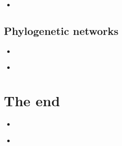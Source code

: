 \documentclass[compress, ucs, xelatex, 11pt, xcolor=x11names, aspectratio=1609,
	hyperref={
		bookmarks=true,
		unicode=true,
		colorlinks=true,
		pdftitle={HybSeq course},
		plainpages=false,
		pdfauthor={Vojtech Zeisek},
		pdfsubject={Practical processing of HybSeq target enrichment sequencing data on computing grids like MetaCentrum},
		pdfcreator={XeLaTeX},
		pdfkeywords={BASH, command line, GNU, HybSeq, Linux, MetaCentrum, sequencing shell, target enrichment},
		linkcolor=Cyan2, %
		anchorcolor=Firebrick2, %
		citecolor=Firebrick2, %
		filecolor=Firebrick2, %
		menucolor=Firebrick2, %
		urlcolor=Chartreuse2, %
		pdftex},
	url={hyphens, lowtilde} %
	]{beamer}
\begin{document}
\begin{frame}[fragile]{}
	\begin{itemize}
		\item 
	\end{itemize}
	\begin{spluscode}
    
	\end{spluscode}
	\begin{bashcode}
    
	\end{bashcode}
\end{frame}

\subsection{Phylogenetic networks}

\begin{frame}[fragile]{}
	\begin{itemize}
		\item 
	\end{itemize}
	\begin{spluscode}
    
	\end{spluscode}
	\begin{bashcode}
    
	\end{bashcode}
\end{frame}

\begin{frame}[fragile]{}
	\begin{itemize}
		\item 
	\end{itemize}
	\begin{spluscode}
    
	\end{spluscode}
	\begin{bashcode}
    
	\end{bashcode}
\end{frame}

\section{The end}

\begin{frame}[fragile]{}
	\begin{itemize}
		\item 
	\end{itemize}
	\begin{spluscode}
    
	\end{spluscode}
	\begin{bashcode}
    
	\end{bashcode}
\end{frame}

\begin{frame}[fragile]{}
	\begin{itemize}
		\item 
	\end{itemize}
	\begin{spluscode}
    
	\end{spluscode}
	\begin{bashcode}
    
	\end{bashcode}
\end{frame}
\end{document}
